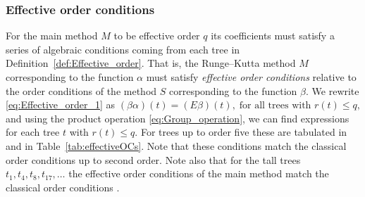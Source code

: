 \subsubsection{Effective order conditions}\label{sec:effOrderCond}

For the main method $M$ to be effective order $q$ its coefficients must satisfy a series of algebraic conditions coming from each tree in Definition~\ref{def:Effective_order}.
That is, the Runge--Kutta method $M$ corresponding to the function $\alpha$ must satisfy
\emph{effective order conditions} relative to the order conditions of the
method $S$ corresponding to the function $\beta$.
We rewrite \eqref{eq:Effective_order_1} as
$(\beta\alpha)(t) = (E\beta)(t), \; \text{for all trees with $r(t) \leq q$,}$
and using the product operation \eqref{eq:Group_operation}, we can find expressions for each tree $t$ with $r(t) \leq q$.
For trees up to order five these are tabulated in \cite[Table~3.89]{Butcher2008_book}
and in Table~\ref{tab:effectiveOCs}.
Note that these conditions match the classical order conditions up to
second order.
Note also that for the tall trees $t_1, t_4, t_8, t_{17}, \dots$ the
effective order conditions of the main method match the classical
order conditions \cite{Butcher2008_book}.
